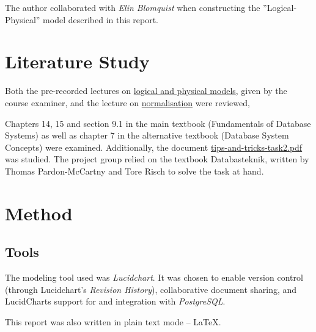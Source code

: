 \documentclass[a4paper]{scrartcl}
\begin{document}
The author collaborated with
\emph{Elin Blomquist}
when constructing the ''Logical-Physical'' model described in this report.


\section{Literature Study}
Both the pre-recorded lectures on
\href{https://canvas.kth.se/courses/43013/pages/logical-and-physical-models}{logical and physical models},
given by the course examiner, and the lecture on
\href{https://canvas.kth.se/courses/43013/pages/normalisation}{normalisation} were reviewed,

Chapters 14, 15 and section 9.1 in the main textbook
(Fundamentals of Database Systems) as well as chapter 7 in the
alternative textbook (Database System Concepts) were examined.
Additionally, the document
\href{https://canvas.kth.se/courses/43013/files/7096103?wrap=1}{tips-and-tricks-task2.pdf}
was studied.
The project group relied on the textbook Databasteknik, written by
Thomas Pardon-McCartny and Tore Risch to solve the task at hand.

\clearpage
\section{Method}
\label{sec:method}


\subsection*{Tools}
The modeling tool used was \emph{Lucidchart}.
It was chosen to enable version control (through Lucidchart's \emph{Revision History}),
collaborative document sharing, and LucidCharts support for and integration with
\emph{PostgreSQL}.

This report was also written in plain text mode -- \LaTeX.
\end{document}

